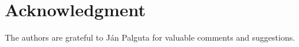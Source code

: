 \documentclass[fleqn,10pt]{wlscirep}
\def\brom{Cyril Brom}
\def\drbohlav{Jakub Drbohlav}
\def\slerka{Josef \v Slerka}
\def\smid{Martin \v Sm\'\i d}
\def\zajic{Milan Zaj\v\i\v cek}
\begin{document}


\section*{Acknowledgment} 

The authors are grateful to Ján Palguta 
for valuable comments and suggestions. 
\end{document}
